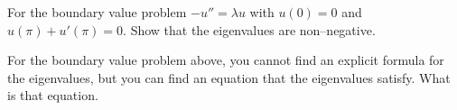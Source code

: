 \documentclass[12pt]{exam}
\begin{document}
\begin{questions}
\newpage 
\begin{question}
For the boundary value problem $-u'' = \lambda u$ with $u(0) =0$ and $u(\pi) + u'(\pi)=0$. 
Show that the eigenvalues are non--negative. 
\end{question}
\begin{solutionorbox}[\stretch{1}]
\end{solutionorbox}

\newpage 
\begin{question}
For the boundary value problem above, you cannot find an explicit formula for the
eigenvalues, but you can find an equation that the eigenvalues satisfy. What 
is that equation. 
\end{question}
\begin{solutionorbox}[\stretch{1}]
\end{solutionorbox}


\end{questions}
\end{document}
